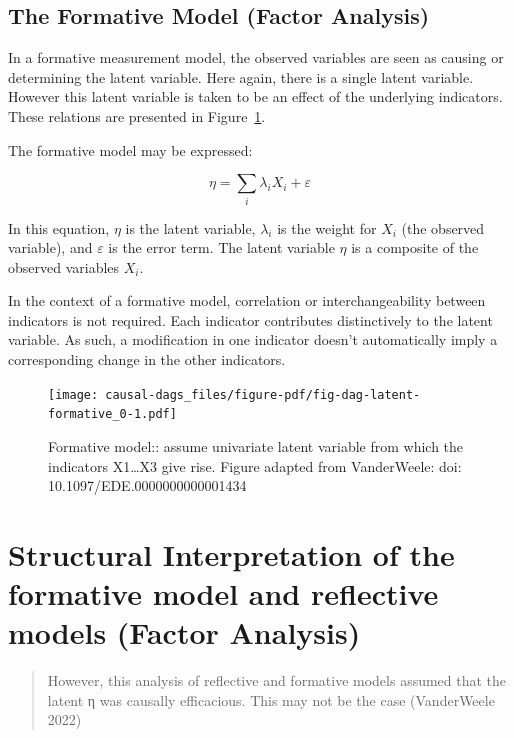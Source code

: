 \documentclass[
  singlecolumn]{report}
\begin{document}
\hypertarget{the-formative-model-factor-analysis}{%
\subsection{The Formative Model (Factor
Analysis)}\label{the-formative-model-factor-analysis}}

In a formative measurement model, the observed variables are seen as
causing or determining the latent variable. Here again, there is a
single latent variable. However this latent variable is taken to be an
effect of the underlying indicators. These relations are presented in
Figure~\ref{fig-dag-latent-formative_0}.

The formative model may be expressed:

\[\eta = \sum_i\lambda_i X_i + \varepsilon\]

In this equation, \(\eta\) is the latent variable, \(\lambda_i\) is the
weight for \(X_i\) (the observed variable), and \(\varepsilon\) is the
error term. The latent variable \(\eta\) is a composite of the observed
variables \(X_i\).

In the context of a formative model, correlation or interchangeability
between indicators is not required. Each indicator contributes
distinctively to the latent variable. As such, a modification in one
indicator doesn't automatically imply a corresponding change in the
other indicators.

\begin{figure}

{\centering \texttt{[image: causal-dags\_files/figure-pdf/fig-dag-latent-formative\_0-1.pdf]}

}

\caption{\label{fig-dag-latent-formative_0}Formative model:: assume
univariate latent variable from which the indicators X1\ldots X3 give
rise. Figure adapted from VanderWeele: doi:
10.1097/EDE.0000000000001434}

\end{figure}

\hypertarget{structural-interpretation-of-the-formative-model-and-reflective-models-factor-analysis}{%
\section{Structural Interpretation of the formative model and reflective
models (Factor
Analysis)}\label{structural-interpretation-of-the-formative-model-and-reflective-models-factor-analysis}}

\begin{quote}
However, this analysis of reflective and formative models assumed that
the latent η was causally efficacious. This may not be the case
(VanderWeele 2022)
\end{quote}
\end{document}
